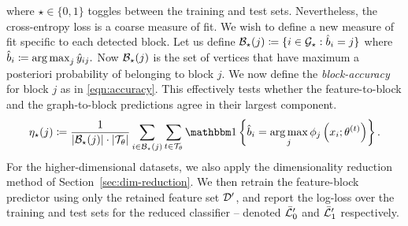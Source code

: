 %
where $\star \in \{0, 1\}$ toggles between the training and test sets.
%
Nevertheless, the cross-entropy loss is a coarse measure of fit. We wish to define a new measure of fit specific to each detected block. Let us define
$
	\mathcal{B}_\star(j) \coloneqq \{i \in \mathcal{G}_\star : \hat{b}_i = j\}
$
where
$ 
	\hat{b}_i \coloneqq \operatorname*{arg\,max}_j \hat{y}_{ij}.
$
Now $\mathcal{B}_\star(j)$ is the set of vertices that have maximum a posteriori probability of belonging to block $j$. We now define the {\em block-accuracy} for block $j$ as in \ref{eqn:accuracy}. This effectively tests whether the feature-to-block and the graph-to-block predictions agree in their largest component.
%
\begin{equation}
	\eta_\star(j) \coloneqq \frac{1}{|\Bcal_\star (j)| \cdot 
	|\Tcal_\theta| } 
	\sum_{i \in \Bcal_\star (j)}  \sum_{t \in \Tcal_\theta}
	\one \left\{\hat{b}_i = \argmax_j \phi_j \left( x_i; \theta^{(t)} \right) \right\}.
	\label{eqn:accuracy}
\end{equation}
%
For the higher-dimensional datasets, we also apply the 
dimensionality reduction method 
of Section~\ref{sec:dim-reduction}.  
We then retrain the feature-block predictor using only the retained 
feature set $\mathcal{D}'$, and report the log-loss over the training and 
test sets for the reduced classifier -- 
denoted $\bar{\mathcal{L}}_0'$ and $\bar{\mathcal{L}}_1'$ respectively. 



